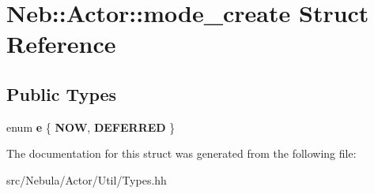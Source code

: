 \hypertarget{structNeb_1_1Actor_1_1mode__create}{\section{Neb\-:\-:Actor\-:\-:mode\-\_\-create Struct Reference}
\label{structNeb_1_1Actor_1_1mode__create}
}
\subsection*{Public Types}
\begin{DoxyCompactItemize}
\item 
enum {\bfseries e} \{ {\bfseries N\-O\-W}, 
{\bfseries D\-E\-F\-E\-R\-R\-E\-D}
 \}
\end{DoxyCompactItemize}


The documentation for this struct was generated from the following file\-:\begin{DoxyCompactItemize}
\item 
src/\-Nebula/\-Actor/\-Util/Types.\-hh\end{DoxyCompactItemize}
